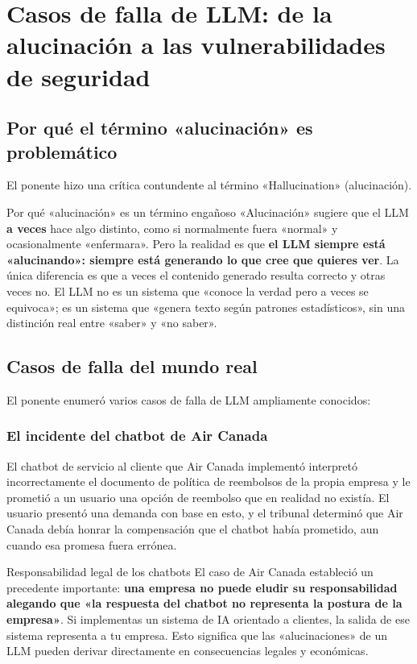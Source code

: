 \documentclass[a4paper]{article}
\begin{document}
\section{Casos de falla de LLM: de la alucinación a las vulnerabilidades de seguridad}

\subsection{Por qué el término «alucinación» es problemático}

El ponente hizo una crítica contundente al término «Hallucination» (alucinación).

\begin{importantbox}{Por qué «alucinación» es un término engañoso}
«Alucinación» sugiere que el LLM \textbf{a veces} hace algo distinto, como si normalmente fuera «normal» y ocasionalmente «enfermara». Pero la realidad es que \textbf{el LLM siempre está «alucinando»: siempre está generando lo que cree que quieres ver}. La única diferencia es que a veces el contenido generado resulta correcto y otras veces no. El LLM no es un sistema que «conoce la verdad pero a veces se equivoca»; es un sistema que «genera texto según patrones estadísticos», sin una distinción real entre «saber» y «no saber».
\end{importantbox}

\subsection{Casos de falla del mundo real}

El ponente enumeró varios casos de falla de LLM ampliamente conocidos:

\subsubsection{El incidente del chatbot de Air Canada}

El chatbot de servicio al cliente que Air Canada implementó interpretó incorrectamente el documento de política de reembolsos de la propia empresa y le prometió a un usuario una opción de reembolso que en realidad no existía. El usuario presentó una demanda con base en esto, y el tribunal determinó que Air Canada debía honrar la compensación que el chatbot había prometido, aun cuando esa promesa fuera errónea.

\begin{warningbox}{Responsabilidad legal de los chatbots}
El caso de Air Canada estableció un precedente importante: \textbf{una empresa no puede eludir su responsabilidad alegando que «la respuesta del chatbot no representa la postura de la empresa»}. Si implementas un sistema de IA orientado a clientes, la salida de ese sistema representa a tu empresa. Esto significa que las «alucinaciones» de un LLM pueden derivar directamente en consecuencias legales y económicas.
\end{warningbox}
\end{document}
